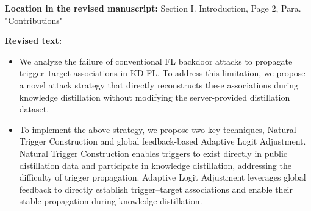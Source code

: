 \documentclass[11pt,a4paper]{article}
\newcommand{\revisedtext}[2]{%
  {\bfseries\color{headingnavy}Location in the revised manuscript:} #1\par
  \begin{tcolorbox}[
      enhanced,breakable,colback=replyblue!3,colframe=replyblue!18,
      before upper={\setlength{\parskip}{6pt}},
      borderline west={2.5pt}{0pt}{replyblue},
      boxrule=0.5pt,arc=1mm,left=11pt,right=9pt,top=8pt,bottom=8pt]
    {\bfseries\color{headingnavy}Revised text:}\par
    #2
  \end{tcolorbox}
  \vspace{0.35em}%
}
\begin{document}
\revisedtext{Section I. Introduction, Page 2, Para. "Contributions"}{\begin{itemize}
  \item We analyze the failure of conventional FL backdoor attacks to propagate trigger--target associations in KD-FL.
  To address this limitation, we propose a novel attack strategy that directly reconstructs these associations during knowledge distillation without modifying the server-provided distillation dataset.

  \item To implement the above strategy, we propose two key techniques, Natural Trigger Construction and global feedback-based Adaptive Logit Adjustment.
  Natural Trigger Construction enables triggers to exist directly in public distillation data and participate in knowledge distillation, addressing the difficulty of trigger propagation.
  Adaptive Logit Adjustment leverages global feedback to directly establish trigger--target associations and enable their stable propagation during knowledge distillation.
\end{itemize}}
\end{document}
